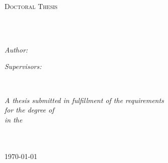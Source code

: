 \documentclass[
11pt, %
english, %
singlespacing, %
openany, %
headsepline, %
]{MastersDoctoralThesis} %
\author{David \textsc{Gómez}} %
\begin{document}
\frontmatter %

\pagestyle{plain} %

\begin{titlepage}
	\begin{center}
		
		\vspace*{.06\textheight}
		{\scshape\LARGE \univname\par}\vspace{1.5cm} %
		\textsc{\Large Doctoral Thesis}\\[0.5cm] %
		
		\HRule \\[0.4cm] %
		{\huge \bfseries \ttitle\par}\vspace{0.4cm} %
		\HRule \\[1.5cm] %
		
		\begin{minipage}[t]{0.4\textwidth}
			\begin{flushleft} \large
				\emph{Author:}\\
				\href{}{\authorname} %
			\end{flushleft}
		\end{minipage}
		\begin{minipage}[t]{0.4\textwidth}
			\begin{flushright} \large
				\emph{Supervisors:} \\
				\href{}{\supname} %
			\end{flushright}
		\end{minipage}\\[3cm]
		
		\vfill
		
		\large \textit{A thesis submitted in fulfillment of the requirements\\ for the degree of \degreename}\\[0.3cm] %
		\textit{in the}\\[0.4cm]
		\groupname\\\deptname\\[2cm] %
		
		\vfill
		
		{\large \today}\\[4cm] %
		
		\vfill
	\end{center}
\end{titlepage}
\end{document}

